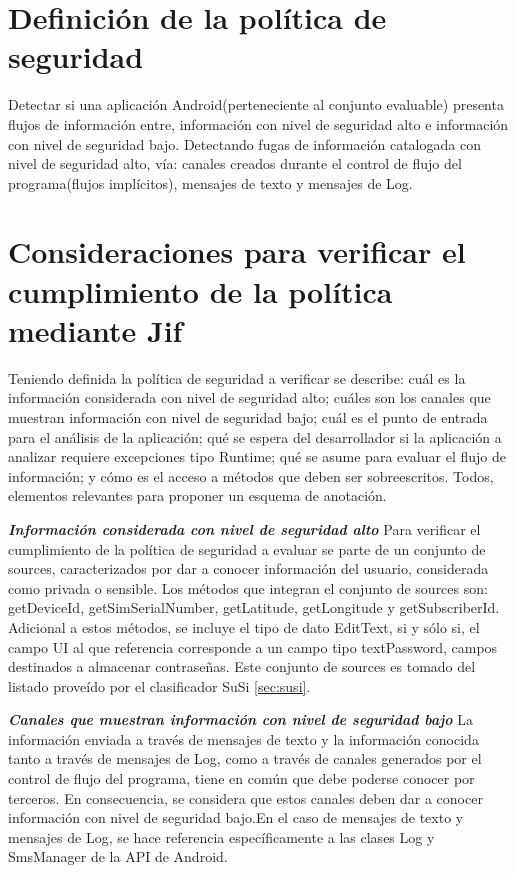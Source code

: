 \section{Definición de la política de seguridad}
\label{subsection:politica}
Detectar si una aplicación Android(perteneciente al conjunto evaluable) presenta
flujos de información entre, información con nivel de seguridad alto e
información con nivel de seguridad bajo.\newline
Detectando fugas de información catalogada con nivel de seguridad alto, vía:
canales creados durante el control de flujo del programa(flujos implícitos),
mensajes de texto y mensajes de Log.\newline 

\section{Consideraciones para verificar el cumplimiento de la política
mediante Jif}
\label{subsec:consVerPol}
Teniendo definida la política de seguridad a verificar se describe: cuál es la
información considerada con nivel de seguridad alto; cuáles son los canales que
muestran información con nivel de seguridad bajo; cuál es el punto de entrada
para el análisis de la aplicación; qué se espera del desarrollador si la aplicación
a analizar requiere excepciones tipo Runtime; qué se asume para evaluar el flujo
de información; y cómo es el acceso a métodos que deben ser
sobreescritos.\newline
Todos, elementos relevantes para proponer un esquema de anotación.

\textit{\textbf{Información considerada con nivel de seguridad alto}}\newline
Para verificar el cumplimiento de la política de seguridad a evaluar se parte de
un conjunto de sources, caracterizados por dar a conocer información del
usuario, considerada como privada o sensible. Los métodos que integran el
conjunto de sources son: getDeviceId, getSimSerialNumber, getLatitude,
getLongitude y getSubscriberId. Adicional a estos métodos, se incluye el tipo de
dato EditText, si y sólo si, el campo UI al que referencia corresponde a un
campo tipo textPassword, campos destinados a almacenar contraseñas.\newline 
Este conjunto de sources es tomado del listado proveído por el clasificador SuSi
\ref{sec:susi}.

\textit{\textbf{Canales que muestran información con nivel de seguridad
bajo}}\newline 
La información enviada a través de mensajes de texto y la
información conocida tanto a través de mensajes de Log, como a través de canales generados por el
control de flujo del programa, tiene en común que debe poderse conocer por
terceros.
En consecuencia, se considera que estos canales deben dar a conocer información
con nivel de seguridad bajo.\newline En el caso de mensajes de texto y mensajes
de Log, se hace referencia específicamente a las clases Log y SmsManager de la
API de Android.

